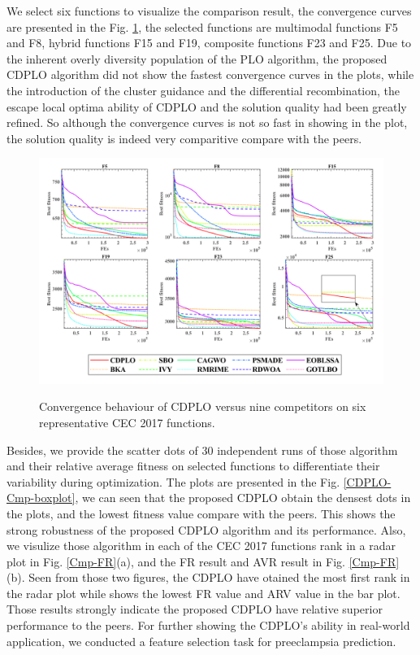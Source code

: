 \documentclass[review]{elsarticle}
\begin{document}
We select six functions to visualize the comparison result, the convergence curves are presented in the Fig. \ref{fig: CDPLO-Cmp}, the selected functions are multimodal functions F5 and F8, hybrid functions F15 and F19, composite functions F23 and F25. Due to the inherent overly diversity population of the PLO algorithm, the proposed CDPLO algorithm did not show the fastest convergence curves in the plots, while the introduction of the cluster guidance and the differential recombination, the escape local optima ability of CDPLO and the solution quality had been greatly refined. So although the convergence curves is not so fast in showing in the plot, the solution quality is indeed very comparitive compare with the peers.

\begin{figure}
\caption{Convergence behaviour of CDPLO versus nine
           competitors on six representative CEC 2017 functions.}
\includegraphics[width=\linewidth]{CDPLO-Cmp}
\label{fig: CDPLO-Cmp}
\end{figure}

Besides, we provide the scatter dots of 30 independent runs of those algorithm and their relative average fitness on selected functions to differentiate their variability during optimization. The plots are presented in the Fig. \ref{CDPLO-Cmp-boxplot}, we can seen that the proposed CDPLO obtain the densest dots in the plots, and the lowest fitness value compare with the peers. This shows the strong robustness of the proposed CDPLO algorithm and its performance. Also, we visulize those algorithm in each of the CEC 2017 functions rank in a radar plot in Fig. \ref{Cmp-FR}(a), and the FR result and AVR result in Fig. \ref{Cmp-FR}(b). Seen from those two figures, the CDPLO have otained the most first rank in the radar plot while shows the lowest FR value and ARV value in the bar plot. Those results strongly indicate the proposed CDPLO have relative superior performance to the peers. For further showing the CDPLO's ability in real-world application, we conducted a feature selection task for preeclampsia prediction.
\end{document}

